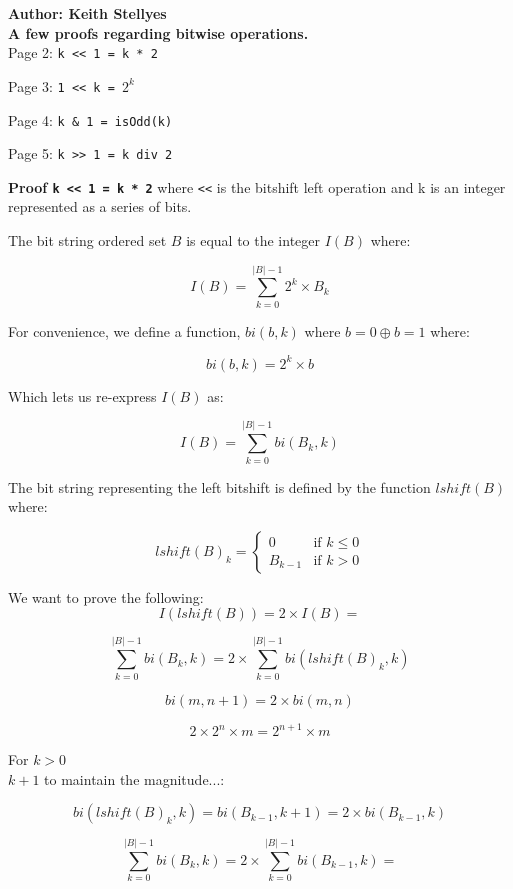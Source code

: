 \documentclass{article}
\begin{document}
	
\textbf{\LARGE Author: Keith Stellyes}\\

\textbf{\Large A few proofs regarding bitwise operations.}\\

Page 2: \texttt{k << 1 = k * 2}

Page 3: \texttt{1 << k = $2^{k}$}

Page 4: \texttt{k \& 1 =  isOdd(k)}

Page 5: \texttt{k >> 1 = k div 2}

\newpage


\textbf{Proof \texttt{k << 1 = k * 2}} where \texttt{<<} is the bitshift left operation and k is an integer represented as a series of bits.\

The bit string ordered set $B$ is equal to the integer $I(B)$ where:

$$I(B) = \sum_{k=0}^{|B| - 1} 2^{k} \times B_{k}$$

For convenience, we define a function, $bi(b, k)$ where $b = 0 \oplus b = 1$ where:

$$bi(b, k) = 2^{k} \times b$$

Which lets us re-express $I(B)$ as:

$$I(B) = \sum_{k=0}^{|B| - 1} bi(B_{k}, k)$$

The bit string representing the left bitshift is defined by the function $lshift(B)$ where:

$$lshift(B)_{k} = \begin{cases}
0 & \mbox{if } k \leq 0\\
B_{k - 1} & \mbox{if } k > 0
\end{cases}
$$

We want to prove the following: $$I(lshift(B)) = 2 \times I(B) = $$ 

$$\sum_{k=0}^{|B| - 1} bi(B_{k}, k) = 2 \times \sum_{k=0}^{|B| - 1} bi(lshift(B)_{k}, k)$$

$$bi(m, n + 1) = 2 \times bi(m, n)$$

$$2 \times 2^{n} \times m = 2^{n + 1} \times m$$

For $k > 0$\\

$k+1$ to maintain the magnitude...:

$$bi(lshift(B)_{k}, k) = bi({B_{k - 1}, k + 1}) = 2 \times bi(B_{k - 1}, k)$$

$$\sum_{k=0}^{|B| - 1} bi(B_{k}, k) = 2 \times \sum_{k=0}^{|B| - 1} bi(B_{k - 1}, k) = $$
\end{document}
